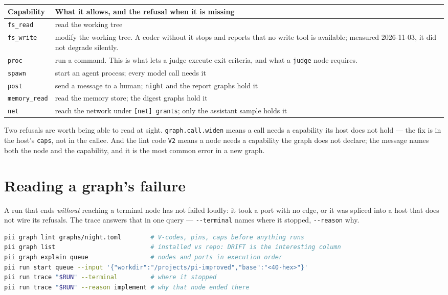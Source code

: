 \begin{longtable}{@{}>{\raggedright\arraybackslash}p{}>{\raggedright\arraybackslash}p{}@{}}
  \toprule
  \textbf{Capability} & \textbf{What it allows, and the refusal when it is missing} \\
  \midrule
  \endhead
  \texttt{fs\_read} & read the working tree \\
  \texttt{fs\_write} & modify the working tree. A coder without it stops and reports that no
    write tool is available; measured 2026-11-03, it did not degrade silently. \\
  \texttt{proc} & run a command. This is what lets a judge execute exit criteria, and what a
    \texttt{judge} node requires. \\
  \texttt{spawn} & start an agent process; every model call needs it \\
  \texttt{post} & send a message to a human; \texttt{night} and the report graphs hold it \\
  \texttt{memory\_read} & read the memory store; the digest graphs hold it \\
  \texttt{net} & reach the network under \texttt{[net] grants}; only the assistant sample
    holds it \\
  \bottomrule
\end{longtable}

Two refusals are worth being able to read at sight. \texttt{graph.call.widen} means a call
needs a capability its host does not hold --- the fix is in the host's \texttt{caps}, not in
the callee. And the lint code \texttt{V2} means a node needs a capability the graph does not
declare; the message names both the node and the capability, and it is the most common error
in a new graph.

\section{Reading a graph's failure}

A run that ends \emph{without} reaching a terminal node has not failed loudly: it took a port
with no edge, or it was spliced into a host that does not wire its refusals. The trace answers
that in one query --- \texttt{-{}-terminal} names where it stopped, \texttt{-{}-reason} why.

\begin{lstlisting}[language=bash]
pii graph lint graphs/night.toml        # V-codes, pins, caps before anything runs
pii graph list                          # installed vs repo: DRIFT is the interesting column
pii graph explain queue                 # nodes and ports in execution order
pii run start queue --input '{"workdir":"/projects/pi-improved","base":"<40-hex>"}'
pii run trace "$RUN" --terminal         # where it stopped
pii run trace "$RUN" --reason implement # why that node ended there
\end{lstlisting}

